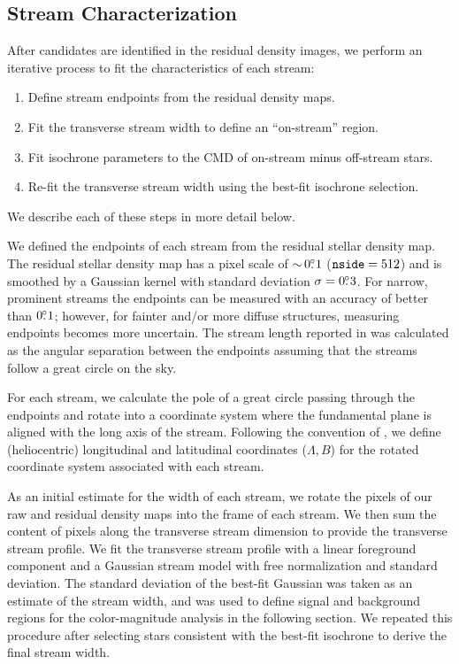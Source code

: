 \documentclass[twocolumn]{aastex61}
\begin{document}
\subsection{Stream Characterization}
\label{sec:spatial}
\label{sec:isochrone}

After candidates are identified in the residual density images, we perform an iterative process to fit the characteristics of each stream:

\begin{enumerate}[noitemsep]
\item Define stream endpoints from the residual density maps.
\item Fit the transverse stream width to define an ``on-stream'' region.
\item Fit isochrone parameters to the CMD of on-stream minus off-stream stars.
\item Re-fit the transverse stream width using the best-fit isochrone selection.
\end{enumerate}
\noindent We describe each of these steps in more detail below.

We defined the endpoints of each stream from the residual stellar density map.
The residual stellar density map has a pixel scale of $ {\sim}\, 0\mbox{$.\!\!^\circ$}1$ ($\texttt{nside} = 512$) and is smoothed by a Gaussian kernel with standard deviation $\sigma = 0\mbox{$.\!\!^\circ$}3$.
For narrow, prominent streams the endpoints can be measured with an accuracy of better than $0\mbox{$.\!\!^\circ$}1$; however, for fainter and/or more diffuse structures, measuring endpoints becomes more uncertain.
The stream length reported in  was calculated as the angular separation between the endpoints assuming that the streams follow a great circle on the sky.

For each stream, we calculate the pole of a great circle passing through the endpoints and rotate into a coordinate system where the fundamental plane is aligned with the long axis of the stream.
Following the convention of \citet{Majewski:2003}, we define (heliocentric) longitudinal and latitudinal coordinates ($\Lambda,B$) for the rotated coordinate system associated with each stream. 

As an initial estimate for the width of each stream, we rotate the \healpix pixels of our raw and residual density maps into the frame of each stream.
We then sum the content of \healpix pixels along the transverse stream dimension to provide the transverse stream profile.
We fit the transverse stream profile with a linear foreground component and a Gaussian stream model with free normalization and standard deviation.
The standard deviation of the best-fit Gaussian was taken as an estimate of the stream width, and was used to define signal and background regions for the color-magnitude analysis in the following section.
We repeated this procedure after selecting stars consistent with the best-fit isochrone to derive the final stream width.
\end{document}
